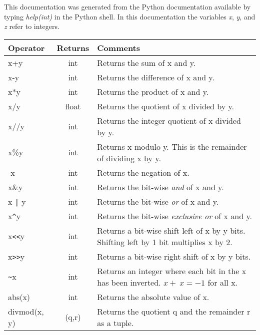 


\appendix


This documentation was generated from the Python documentation available by typing {\em help(int)} in the Python shell. In this documentation the variables {\em x}, {\em y}, and {\em z} refer to integers.

\label{intmethods}

\begin{center}
{\small
\begin{tabular}{|l|c|p{2.2in}|} \hline
{\bf Operator} & {\bf Returns} & {\bf Comments} \\ \hline\hline
x+y& int & Returns the sum of x and y.
 \\ \hline
 x-y & int & Returns the difference of x and y.
 \\ \hline
 x*y & int & Returns the product of x and y.
 \\ \hline 
 x/y & float & Returns the quotient of x divided by y.
 \\ \hline
 x//y & int & Returns the integer quotient of x divided by y.
 \\ \hline
 x\%y & int & Returns x modulo y. This is the remainder of dividing x by y. 
 \\ \hline
 -x & int & Returns the negation of x. 
 \\ \hline 
  x\&y & int  & Returns the bit-wise {\em and} of x and y.
 \\ \hline
 x \verb+|+ y & int & Returns the bit-wise {\em or} of x and y.
 \\ \hline
 x\verb+^+y & int & Returns the bit-wise {\em exclusive or} of x and y. 
 \\ \hline
 x\verb+<<+y &  int & Returns a bit-wise shift left of x by y bits. Shifting left by 1 bit multiplies x by 2. 
 \\ \hline 
 x\verb+>>+y &int & Returns a bit-wise right shift of x by y bits. 
 \\ \hline
 \verb+~+x & int & Returns an integer where each bit in the x has been inverted. $x + ~x = -1$ for all x. 
 \\ \hline  
 abs(x) & int & Returns the absolute value of x.
 \\ \hline
 divmod(x, y) & (q,r) & Returns the quotient q and the remainder r as a tuple.

\end{tabular}}
\end{center}
